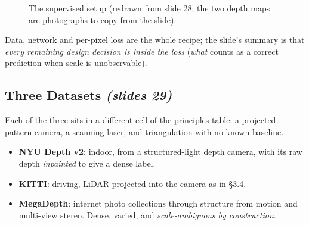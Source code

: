 \documentclass[11pt,a4paper]{article}
\numberwithin{equation}{section}
\newcommand{\slides}[1]{\texorpdfstring{\;\emph{(slides #1)}}{ (slides #1)}}
\theoremstyle{plain}
\theoremstyle{definition}
\begin{document}
\begin{figure}[htbp]
\centering
{}
\caption{The supervised setup (redrawn from slide 28; the two depth maps are photographs to copy from the slide).}
\end{figure}
 
\begin{intuition}
Data, network and per-pixel loss are the whole recipe; the slide's summary is that \emph{every remaining design decision is inside the loss} (\emph{what} counts as a correct prediction when scale is unobservable).
\end{intuition}
 
\subsection{Three Datasets \slides{29}}
 
Each of the three sits in a different cell of the principles table: a projected-pattern camera, a scanning laser, and triangulation with no known baseline.
 
\begin{itemize}
\item \textbf{NYU Depth v2}: indoor, from a structured-light depth camera, with its raw depth \emph{inpainted} to give a dense label.
\item \textbf{KITTI}: driving, LiDAR projected into the camera as in \S3.4.
\item \textbf{MegaDepth}: internet photo collections through structure from motion and multi-view stereo. Dense, varied, and \emph{scale-ambiguous by construction}.
\end{itemize}
 
\end{document}
